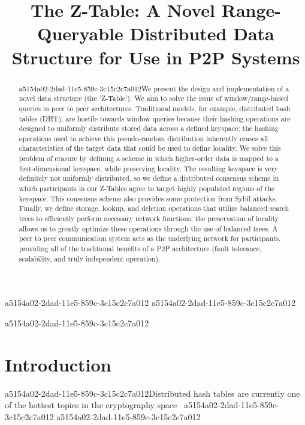\documentclass[12pt]{article}
\title{The Z-Table: A Novel Range-Queryable Distributed Data Structure for Use in P2P Systems}
\begin{document}
\maketitle
a5154a02-2dad-11e5-859c-3c15c2c7a012
a5154a02-2dad-11e5-859c-3c15c2c7a012\begin{abstract}
a5154a02-2dad-11e5-859c-3c15c2c7a012We present the design and implementation of a novel data structure (the 'Z-Table'). We aim to solve the issue of window/range-based queries in peer to peer architectures. Traditional models, for example,  distributed hash tables (DHT), are hostile towards window queries because their hashing operations are designed to uniformly distribute stored data across a defined keyspace; the hashing operations used to achieve this pseudo-random distribution inherently erases all characteristics of the target data that could be used to define locality. We solve this problem of erasure by defining a scheme in which higher-order data is mapped to a first-dimensional keyspace, while preserving locality. The resulting keyspace is very definitely not uniformly distributed, so we define a distributed consensus scheme in which participants in our Z-Tables agree to target highly populated regions of the keyspace. This consensus scheme also provides some protection from Sybil attacks. Finally, we define storage, lookup, and deletion operations that utilize balanced search trees to efficiently perform necessary network functions; the preservation of locality allows us to greatly optimize these operations through the use of balanced trees. A peer to peer communication system acts as the underlying network for participants, providing all of the traditional benefits of a P2P architecture (fault tolerance, scalability, and truly independent operation).
\end{abstract}


a5154a02-2dad-11e5-859c-3c15c2c7a012\newpage
\section{Introduction}
a5154a02-2dad-11e5-859c-3c15c2c7a012Distributed hash tables are currently one of the hottest topics in the cryptography space~\cite{Stoica:2001dj,Rowstron:2001ea,Ratnasamy:2001wn}
a5154a02-2dad-11e5-859c-3c15c2c7a012
a5154a02-2dad-11e5-859c-3c15c2c7a012\printbibliography
\end{document}
